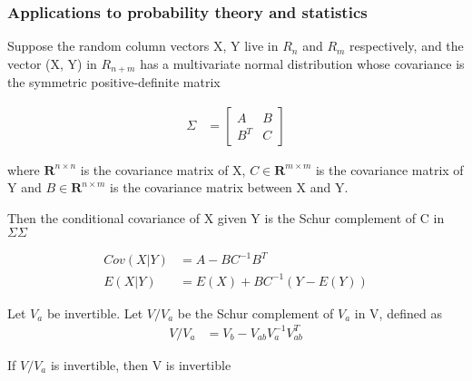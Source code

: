 \documentclass[11pt]{article} %
\begin{document}
\subsubsection{Applications to probability theory and statistics}
Suppose the random column vectors X, Y live in $R_n$ and $R_m$ respectively, and the vector (X, Y) in $R_{n + m}$ has a multivariate normal distribution whose covariance is the symmetric positive-definite matrix

\begin{align*}
	\Sigma &= \begin{bmatrix}
		A & B \\
		B^T & C
	\end{bmatrix} 
\end{align*}

where $\mathbf{R} ^{n\times n}$ is the covariance matrix of X, ${ C\in \mathbf {R} ^{m\times m}}$ is the covariance matrix of Y and ${ B\in \mathbf {R} ^{n\times m}}$ is the covariance matrix between X and Y.

Then the conditional covariance of X given Y is the Schur complement of C in ${\textstyle \Sigma }{\textstyle \Sigma }$

\begin{align*}
	Cov(X|Y) &= A - B C^{-1}B^T \\
	E(X|Y) &= E(X) + B C^{-1} (Y- E(Y))
\end{align*}



Let $V_a$ be invertible. Let $V/V_a$ be the Schur complement of $V_a$ in V, defined as
\begin{align*}
	V/V_a &= V_b - V_{ab} V_{a}^{-1} V_{ab}^T
\end{align*}

If $V/V_a$ is invertible, then V is invertible 
\end{document}
